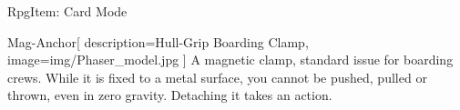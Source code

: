 \begin{ExampleBlock}{RpgItem: Card Mode}
\begin{RpgItem}[width=5cm, height=7cm]{Mag-Anchor}[
    description={Hull-Grip Boarding Clamp},
    image={img/Phaser_model.jpg}
]
    A magnetic clamp, standard issue for boarding crews. While it is fixed to a metal surface, you cannot be pushed, pulled or thrown, even in zero gravity. Detaching it takes an action.
\end{RpgItem}


\end{ExampleBlock}
